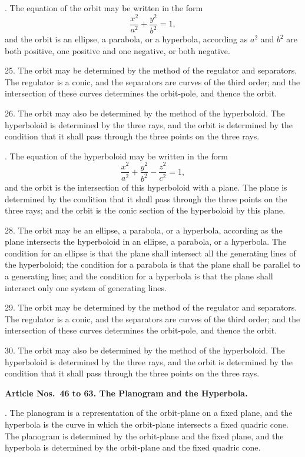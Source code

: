 \documentclass[11pt,a4paper]{article}
\theoremstyle{definition}
\begin{document}
\newpage
{}. The equation of the orbit may be written in the form
\[
\frac{x^2}{a^2} + \frac{y^2}{b^2} = 1,
\]
and the orbit is an ellipse, a parabola, or a hyperbola, according as $a^2$ and $b^2$ are both
positive, one positive and one negative, or both negative.

25. The orbit may be determined by the method of the regulator and separators. The
regulator is a conic, and the separators are curves of the third order; and the intersection
of these curves determines the orbit-pole, and thence the orbit.

26. The orbit may also be determined by the method of the hyperboloid. The
hyperboloid is determined by the three rays, and the orbit is determined by the condition
that it shall pass through the three points on the three rays.

\newpage
{}. The equation of the hyperboloid may be written in the form
\[
\frac{x^2}{a^2} + \frac{y^2}{b^2} - \frac{z^2}{c^2} = 1,
\]
and the orbit is the intersection of this hyperboloid with a plane. The plane is determined
by the condition that it shall pass through the three points on the three rays; and the
orbit is the conic section of the hyperboloid by this plane.

28. The orbit may be an ellipse, a parabola, or a hyperbola, according as the plane
intersects the hyperboloid in an ellipse, a parabola, or a hyperbola. The condition for an
ellipse is that the plane shall intersect all the generating lines of the hyperboloid; the
condition for a parabola is that the plane shall be parallel to a generating line; and the
condition for a hyperbola is that the plane shall intersect only one system of generating
lines.

29. The orbit may be determined by the method of the regulator and separators. The
regulator is a conic, and the separators are curves of the third order; and the intersection
of these curves determines the orbit-pole, and thence the orbit.

30. The orbit may also be determined by the method of the hyperboloid. The
hyperboloid is determined by the three rays, and the orbit is determined by the condition
that it shall pass through the three points on the three rays.

\newpage
\noindent
\textbf{Article Nos.~46 to 63. The Planogram and the Hyperbola.}

\smallskip

. The planogram is a representation of the orbit-plane on a fixed plane, and the
hyperbola is the curve in which the orbit-plane intersects a fixed quadric cone. The
planogram is determined by the orbit-plane and the fixed plane, and the hyperbola is
determined by the orbit-plane and the fixed quadric cone.
\end{document}
